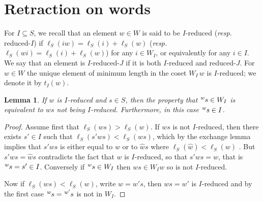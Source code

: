 \documentclass{amsart}
\numberwithin{equation}{section}
\newtheorem{lemma}[equation]{Lemma}
\newcommand\lexp[2]{\kern\scriptspace\vphantom{#2}^{#1}\kern-\scriptspace#2}
\begin{document}
\section{Retraction on words}\label{section1}
For $I\subseteq S$, we  recall  that  an  element  $w\in W$ is said to be
$I$-reduced   (\emph{resp.}  reduced-$I$)   if  $\ell_S(iw)=\ell_S(i)+\ell_S(w)$
(\emph{resp.}  $\ell_S(wi)=\ell_S(i)+\ell_S(w)$)   for   any   $i\in   W_I$,  or
equivalently for any $i\in I$. We say that an element is $I$-reduced-$J$ if
it  is both $I$-reduced  and reduced-$J$. For  $w\in W$  the unique element of
minimum  length in  the coset  $W_I\, w$  is $I$-reduced;  we denote  it by
 $t_I(w)$.

\begin{lemma}\label{lemma 1}
If  $w$ is $I$-reduced and $s\in  S$, then the property that $\lexp{w}s\in W_I$
is  equivalent to  $ws$ not  being $I$-reduced.  Furthermore, in  this case
$\lexp w s\in I$.
\end{lemma}
\begin{proof}Assume first that $\ell_S(ws)>\ell_S(w)$.
If $ws$ is not $I$-reduced, then there exists $s'\in I$ such
that $\ell_S(s'ws)<\ell_S(ws)$, which by the exchange lemma implies that $s'ws$ is
either equal to $w$ or to $\hat ws$ where $\ell_S(\hat w)<\ell_S(w)$ . But $s'ws=\hat
ws$  contradicts the fact that $w$ is  $I$-reduced, so that $s'ws=w$, that
is  $\lexp w  s=s'\in I$.  Conversely if $\lexp w s\in W_I$ then $ws\in W_I w$ so is not
$I$-reduced.

Now if $\ell_S(ws)<\ell_S(w)$, write $w=w's$, then $ws=w'$ is $I$-reduced and by the first
case $\lexp w s=\lexp {w'}s$ is not in $W_I$.
\end{proof}
\end{document}

